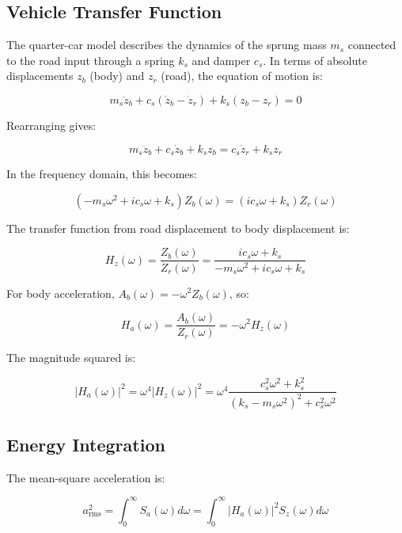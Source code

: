 \documentclass[11pt]{article}
\begin{document}
\subsection{Vehicle Transfer Function}

The quarter-car model describes the dynamics of the sprung mass $m_s$ connected to the road input through a spring $k_s$ and damper $c_s$. In terms of absolute displacements $z_b$ (body) and $z_r$ (road), the equation of motion is:

$$m_s \ddot{z}_b + c_s(\dot{z}_b - \dot{z}_r) + k_s(z_b - z_r) = 0$$

Rearranging gives:

\begin{equation}
m_s \ddot{z}_b + c_s \dot{z}_b + k_s z_b = c_s \dot{z}_r + k_s z_r
\end{equation}

In the frequency domain, this becomes:

\begin{equation}
(-m_s \omega^2 + i c_s \omega + k_s) Z_b(\omega) = (i c_s \omega + k_s) Z_r(\omega)
\end{equation}

The transfer function from road displacement to body displacement is:

\begin{equation}
H_z(\omega) = \frac{Z_b(\omega)}{Z_r(\omega)} = \frac{i c_s \omega + k_s}{-m_s \omega^2 + i c_s \omega + k_s}
\end{equation}

For body acceleration, $A_b(\omega) = -\omega^2 Z_b(\omega)$, so:

\begin{equation}
H_a(\omega) = \frac{A_b(\omega)}{Z_r(\omega)} = -\omega^2 H_z(\omega)
\end{equation}

The magnitude squared is:

\begin{equation}
|H_a(\omega)|^2 = \omega^4 |H_z(\omega)|^2 = \omega^4 \frac{c_s^2 \omega^2 + k_s^2}{(k_s - m_s \omega^2)^2 + c_s^2 \omega^2}
\end{equation}

\subsection{Energy Integration}

The mean-square acceleration is:

\begin{equation}
a_{\text{rms}}^2 = \int_0^\infty S_a(\omega) d\omega = \int_0^\infty |H_a(\omega)|^2 S_z(\omega) d\omega
\end{equation}
\end{document}
